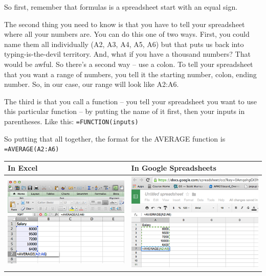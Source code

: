 \documentclass[]{book}
\begin{document}
So first, remember that formulas is a spreadsheet start with an equal sign.

The second thing you need to know is that you have to tell your spreadsheet where all your numbers are. You can do this one of two ways. First, you could name them all individually (A2, A3, A4, A5, A6) but that puts us back into typing-is-the-devil territory. And, what if you have a thousand numbers? That would be awful. So there's a second way -- use a colon. To tell your spreadsheet that you want a range of numbers, you tell it the starting number, colon, ending number. So, in our case, our range will look like A2:A6.

The third is that you call a function -- you tell your spreadsheet you want to use this particular function -- by putting the name of it first, then your inputs in parentheses. Like this: \texttt{=FUNCTION(inputs)}

So putting that all together, the format for the AVERAGE function is \texttt{=AVERAGE(A2:A6)}

\begin{longtable}[]{@{}ll@{}}
\toprule
In Excel & In Google Spreadsheets\tabularnewline
\midrule
\endhead
\includegraphics{images/excelmean2.png} & \includegraphics{images/googlemean2.png}\tabularnewline
\bottomrule
\end{longtable}
\end{document}
